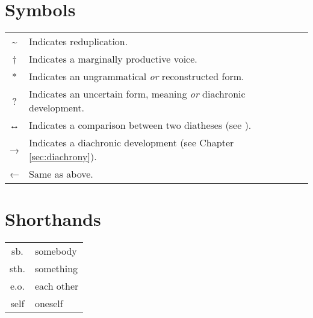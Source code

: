 \section*{Symbols}
\begin{tabularx}{.95\textwidth}{cQ}
	\~{} & Indicates reduplication. \\
	† & Indicates a marginally productive voice. \\
	* & Indicates an ungrammatical \textit{or} reconstructed form. \\
	? & Indicates an uncertain form, meaning \textit{or} diachronic development. \\
	↔ & Indicates a comparison between two diatheses (see ).  \\
	→ & Indicates a diachronic development (see Chapter \ref{sec:diachrony}).  \\
	← & Same as above. \\
\end{tabularx}

\section*{Shorthands}
\begin{tabularx}{.95\textwidth}{cQ}
	sb. & somebody \\
	sth. & something \\
	e.o. & each other \\
	self & oneself \\
\end{tabularx}